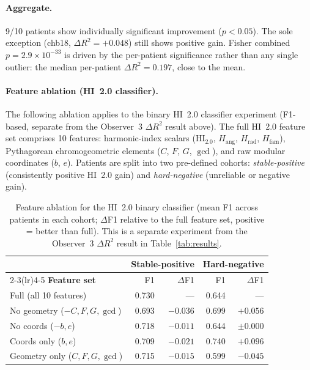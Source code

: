 \documentclass[11pt]{article}
\begin{document}
\paragraph{Aggregate.}
9/10 patients show individually significant improvement ($p < 0.05$).
The sole exception (chb18, $\Delta R^2 = +0.048$) still shows positive gain.
Fisher combined $p = 2.9 \times 10^{-33}$ is driven by the per-patient
significance rather than any single outlier: the median per-patient
$\Delta R^2 = 0.197$, close to the mean.

\paragraph{Feature ablation (HI~2.0 classifier).}
The following ablation applies to the binary HI~2.0 classifier experiment
(F1-based, separate from the Observer~3 $\Delta R^2$ result above).
The full HI~2.0 feature set comprises 10 features:
harmonic-index scalars (HI$_{2.0}$, $H_\text{ang}$, $H_\text{rad}$, $H_\text{fam}$),
Pythagorean chromogeometric elements ($C$, $F$, $G$, $\gcd$),
and raw modular coordinates ($b$, $e$).
Patients are split into two pre-defined cohorts:
\emph{stable-positive} (consistently positive HI~2.0 gain) and
\emph{hard-negative} (unreliable or negative gain).

\begin{table}[h]
\centering
\small
\begin{tabular}{lrrrr}
\toprule
& \multicolumn{2}{c}{\textbf{Stable-positive}} & \multicolumn{2}{c}{\textbf{Hard-negative}} \\
\cmidrule(lr){2-3}\cmidrule(lr){4-5}
\textbf{Feature set} & F1 & $\Delta$F1 & F1 & $\Delta$F1 \\
\midrule
Full (all 10 features)          & 0.730 & ---    & 0.644 & --- \\
No geometry ($-C,F,G,\gcd$)     & 0.693 & $-0.036$ & 0.699 & $+0.056$ \\
No coords ($-b,e$)              & 0.718 & $-0.011$ & 0.644 & $\pm 0.000$ \\
Coords only ($b,e$)             & 0.709 & $-0.021$ & 0.740 & $+0.096$ \\
Geometry only ($C,F,G,\gcd$)    & 0.715 & $-0.015$ & 0.599 & $-0.045$ \\
\bottomrule
\end{tabular}
\caption{Feature ablation for the HI~2.0 binary classifier (mean F1 across patients
in each cohort; $\Delta$F1 relative to the full feature set, positive = better than full).
This is a separate experiment from the Observer~3 $\Delta R^2$ result in Table~\ref{tab:results}.}
\label{tab:ablation}
\end{table}
\end{document}
